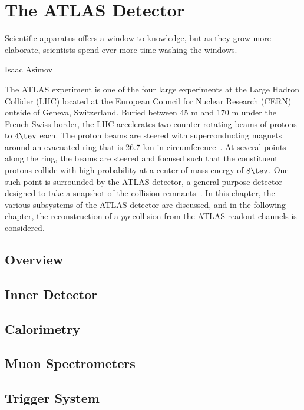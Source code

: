 \chapter{The ATLAS Detector}
\label{chap:detector}

\epigraph{Scientific apparatus offers a window to knowledge, but as
  they grow more elaborate, scientists spend ever more time washing
  the windows.}{Isaac Asimov}

The ATLAS experiment is one of the four large experiments at the Large
Hadron Collider (LHC) located at the European
Council for Nuclear Research (CERN) outside of Geneva,
Switzerland. Buried between 45 m and 170 m under the French-Swiss
border, the LHC accelerates two counter-rotating beams of protons to
$4 \tev$ each. The proton beams are steered with superconducting
magnets around an
evacuated ring that is 26.7 km in circumference~\cite{bib:Evans:2008zzb}. At several points along
the ring, the beams are steered and focused such that the constituent
protons collide with high probability at a center-of-mass energy of $8
\tev$. One such point is surrounded by the ATLAS detector, a
general-purpose detector designed to take a snapshot of the collision
remnants~\cite{bib:Aad:2008zzm}. In this chapter, the various subsystems of the ATLAS
detector are discussed, and in the following chapter, the
reconstruction of a $pp$ collision from the ATLAS readout channels is
considered. 

\section{Overview}
\label{chapter:detector:section:overview}


\section{Inner Detector}
\label{chapter:detector:section:inner_detector}


\section{Calorimetry}
\label{chapter:detector:section:calorimeter}


\section{Muon Spectrometers}
\label{chapter:detector:section:muon}


\section{Trigger System}
\label{chapter:detector:section:trigger}





